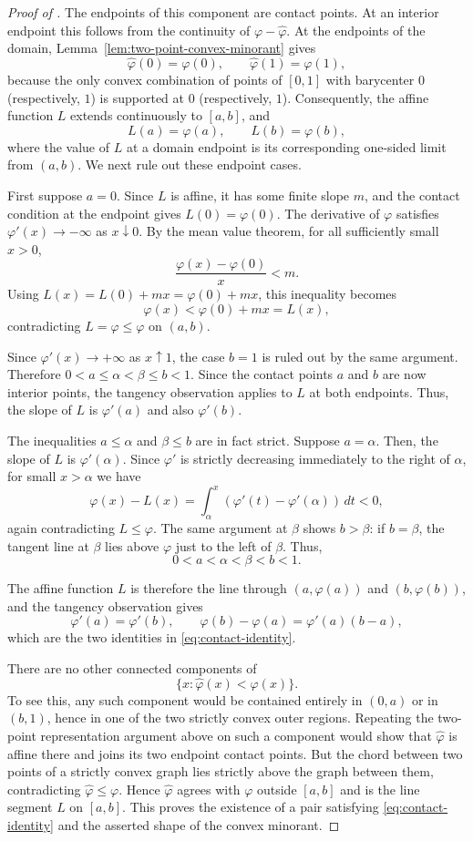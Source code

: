 \begin{proof}[Proof of ]
The endpoints of this component are contact points.  At an interior
endpoint this follows from the continuity of
$\varphi-\widehat\varphi$.  At the endpoints of the domain,
Lemma~\ref{lem:two-point-convex-minorant} gives
\[
  \widehat\varphi(0)=\varphi(0),
  \qquad
  \widehat\varphi(1)=\varphi(1),
\]
because the only convex combination of points of $[0,1]$ with barycenter
$0$ (respectively, $1$) is supported at $0$ (respectively, $1$).
Consequently, the affine function $L$ extends continuously to $[a,b]$, and
\[
  L(a)=\varphi(a),\qquad L(b)=\varphi(b),
\]
where the value of $L$ at a domain endpoint is its corresponding one-sided
limit from $(a,b)$.  We next rule out these endpoint cases.

First suppose $a=0$.  Since $L$ is affine, it has some finite slope $m$, and
the contact condition at the endpoint gives $L(0)=\varphi(0)$.  The derivative
of $\varphi$ satisfies $\varphi'(x)\to-\infty$ as $x\downarrow0$.  By the mean
value theorem, for all sufficiently small $x>0$,
\[
  \frac{\varphi(x)-\varphi(0)}{x}<m.
\]
Using $L(x)=L(0)+mx=\varphi(0)+mx$, this inequality becomes
\[
  \varphi(x)<\varphi(0)+mx=L(x),
\]
contradicting $L=\widehat\varphi\le\varphi$ on $(a,b)$.

Since $\varphi'(x)\to+\infty$ as $x\uparrow1$, the case $b=1$ is ruled out by
the same argument.  Therefore $0<a\le\alpha<\beta\le b<1$.
Since the contact points $a$ and $b$ are now interior points, the tangency
observation applies to $L$ at both endpoints.  Thus, the slope of $L$ is
$\varphi'(a)$ and also $\varphi'(b)$.

The inequalities $a\le\alpha$ and $\beta\le b$ are in fact strict.  Suppose
$a=\alpha$.  Then, the slope of $L$ is $\varphi'(\alpha)$.  Since $\varphi'$ is
strictly decreasing immediately to the right of $\alpha$, for small
$x>\alpha$ we have
\[
  \varphi(x)-L(x)
  =
  \int_\alpha^x(\varphi'(t)-\varphi'(\alpha))\,dt
  <0,
\]
again contradicting $L\le\varphi$.  The same argument at $\beta$ shows
$b>\beta$: if $b=\beta$, the tangent line at $\beta$ lies above $\varphi$ just
to the left of $\beta$.
Thus,
\[
  0<a<\alpha<\beta<b<1.
\]

The affine function $L$ is therefore the line through
$(a,\varphi(a))$ and $(b,\varphi(b))$, and the tangency observation gives
\[
  \varphi'(a)=\varphi'(b),
  \qquad
  \varphi(b)-\varphi(a)=\varphi'(a)(b-a),
\]
which are the two identities in \eqref{eq:contact-identity}.

There are no other connected components of
\[
  \{x:\widehat\varphi(x)<\varphi(x)\}.
\]
To see this, any such component would be contained entirely in $(0,a)$ or in
$(b,1)$, hence in one of the two strictly convex outer regions.  Repeating
the two-point representation argument above on such a component would show
that $\widehat\varphi$ is affine there and joins its two endpoint contact
points.  But the chord between two points of a strictly convex graph lies
strictly above the graph between them, contradicting
$\widehat\varphi\le\varphi$.  Hence
$\widehat\varphi$ agrees with $\varphi$ outside $[a,b]$ and is the line segment
$L$ on $[a,b]$.  This proves the existence of a pair satisfying
\eqref{eq:contact-identity} and the asserted shape of the
convex minorant.


\end{proof}
